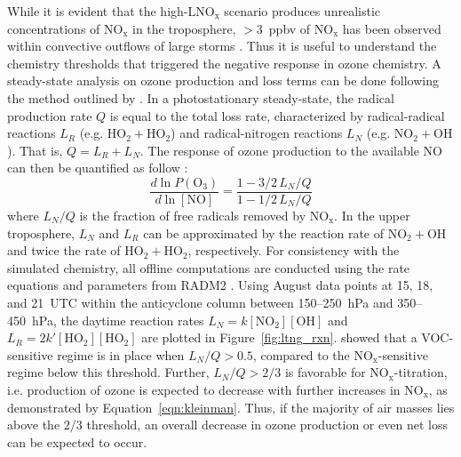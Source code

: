 While it is evident that the high-LNO$_\mathrm{x}$ scenario produces unrealistic
concentrations of NO$_\mathrm{x}$ in the troposphere, $>3$~ppbv of
NO$_\mathrm{x}$ has been observed within convective outflows of large
storms \citep[e.g.][]{Stith:1999fk,Ridley:2004oa,Ott:2007hs,Cummings:2013vn}. Thus it is useful to understand the
chemistry thresholds that triggered the negative response in ozone chemistry.
A steady-state analysis on ozone production and loss terms can be done
following the method outlined by \citet{Kleinman:1997vn}. In a photostationary steady-state, the radical
production rate $Q$ is equal to the total loss rate, characterized by radical-radical
reactions $L_R$ (e.g. $\mathrm{HO_2+HO_2}$) and radical-nitrogen reactions
$L_N$ (e.g. $\mathrm{NO_2+OH}$). That is, $Q=L_R+L_N$. The response of
ozone production to the available NO can then be quantified as follow
\citep{Kleinman:1997vn}:
\begin{equation}\label{eqn:kleinman}
\frac{d\ln P(\mathrm{O_3})}{d\ln[\mathrm{NO}]} =
\frac{1-3/2\,L_N/Q}{1-1/2\,L_N/Q}
\end{equation}
where $L_N/Q$ is the fraction of free radicals removed by NO$_\mathrm{x}$.
In the upper troposphere, $L_N$ and $L_R$ can be approximated by the
reaction rate of $\mathrm{NO_2+OH}$ and twice the rate of
$\mathrm{HO_2+HO_2}$, respectively. For consistency with the simulated chemistry,
all offline computations are conducted using the rate equations and parameters from RADM2
\citep[][and references therein]{Stockwell:1990ez}. Using August data points
at 15, 18, and 21~UTC within the anticyclone column between 150--250~hPa
and 350--450~hPa, the daytime reaction rates $L_N=k\mathrm{[NO_2][OH]}$ and
$L_R=2k'\mathrm{[HO_2][HO_2]}$ are plotted in Figure~\ref{fig:ltng_rxn}.
\citet{Kleinman:2001fk} showed that
a VOC-sensitive regime is in place when $L_N/Q>0.5$, compared to the NO$_\mathrm{x}$-sensitive regime
below this threshold. Further, $L_N/Q>2/3$ is favorable for NO$_\mathrm{x}$-titration,
i.e. production of ozone is expected to decrease with further increases in
NO$_\mathrm{x}$, as demonstrated by Equation~\ref{eqn:kleinman}. Thus,
if the majority of air masses lies above the $2/3$ threshold, an overall decrease
in ozone production or even net loss can be expected to occur.

